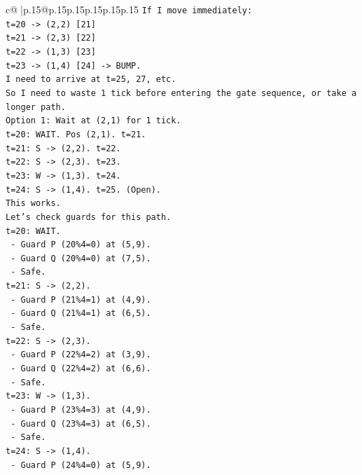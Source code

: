 \documentclass{article}
\begin{document}
{\begin{supertabular}{c@{$\;$}|p{.15\linewidth}@{}p{.15\linewidth}p{.15\linewidth}p{.15\linewidth}p{.15\linewidth}p{.15\linewidth}}
{{{\texttt{If I move immediately:} \\
\texttt{t=20 {-}> (2,2) {[}21{]}} \\
\texttt{t=21 {-}> (2,3) {[}22{]}} \\
\texttt{t=22 {-}> (1,3) {[}23{]}} \\
\texttt{t=23 {-}> (1,4) {[}24{]} {-}> BUMP.} \\
\texttt{I need to arrive at t=25, 27, etc.} \\
\texttt{So I need to waste 1 tick before entering the gate sequence, or take a longer path.} \\
\texttt{Option 1: Wait at (2,1) for 1 tick.} \\
\texttt{t=20: WAIT. Pos (2,1). t=21.} \\
\texttt{t=21: S {-}> (2,2). t=22.} \\
\texttt{t=22: S {-}> (2,3). t=23.} \\
\texttt{t=23: W {-}> (1,3). t=24.} \\
\texttt{t=24: S {-}> (1,4). t=25. (Open).} \\
\texttt{This works.} \\
\texttt{Let's check guards for this path.} \\
\texttt{t=20: WAIT.} \\
\texttt{  {-} Guard P (20\%4=0) at (5,9).} \\
\texttt{  {-} Guard Q (20\%4=0) at (7,5).} \\
\texttt{  {-} Safe.} \\
\texttt{t=21: S {-}> (2,2).} \\
\texttt{  {-} Guard P (21\%4=1) at (4,9).} \\
\texttt{  {-} Guard Q (21\%4=1) at (6,5).} \\
\texttt{  {-} Safe.} \\
\texttt{t=22: S {-}> (2,3).} \\
\texttt{  {-} Guard P (22\%4=2) at (3,9).} \\
\texttt{  {-} Guard Q (22\%4=2) at (6,6).} \\
\texttt{  {-} Safe.} \\
\texttt{t=23: W {-}> (1,3).} \\
\texttt{  {-} Guard P (23\%4=3) at (4,9).} \\
\texttt{  {-} Guard Q (23\%4=3) at (6,5).} \\
\texttt{  {-} Safe.} \\
\texttt{t=24: S {-}> (1,4).} \\
\texttt{  {-} Guard P (24\%4=0) at (5,9).} \\
}}}
\end{supertabular}}
\end{document}
